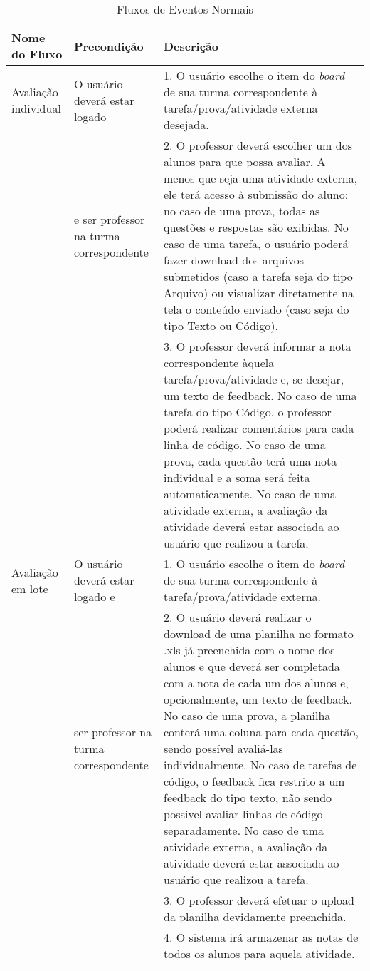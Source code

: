 \begin{table}[H]
	\centering \vspace{0.5cm} \footnotesize
	\caption{Fluxos de Eventos Normais}
	\begin{tabular}{|p{2.3cm}|p{2.5cm}|p{10cm}|} \hline  \rowcolor[rgb]{0.8,0.8,0.8}
		
		Nome do Fluxo & Precondição & Descrição  \\ \hline		
		
		Avaliação individual & O usuário deverá estar logado& 1. O usuário escolhe o item do \textit{board} de sua turma correspondente à tarefa/prova/atividade externa desejada.  \\
		{}    &  e ser professor na turma correspondente & 2. O professor deverá escolher um dos alunos para que possa avaliar. A menos que seja uma atividade externa, ele terá acesso à submissão do aluno: no caso de uma prova, todas as questões e respostas são exibidas. No caso de uma tarefa, o usuário poderá fazer download dos arquivos submetidos (caso a tarefa seja do tipo Arquivo) ou visualizar diretamente na tela o conteúdo enviado (caso seja do tipo Texto ou Código). \\
		{}    &  & 3. O professor deverá informar a nota correspondente àquela tarefa/prova/atividade e, se desejar, um texto de feedback. No caso de uma tarefa do tipo Código, o professor poderá realizar comentários para cada linha de código. No caso de uma prova, cada questão terá uma nota individual e a soma será feita automaticamente. No caso de uma atividade externa, a avaliação da atividade deverá estar associada ao usuário que realizou a tarefa.\\ \hline
		
		Avaliação em lote& O usuário deverá estar logado e & 1. O usuário escolhe o item do \textit{board} de sua turma correspondente à tarefa/prova/atividade externa.  \\
		{}     &  ser professor na turma correspondente & 2. O usuário deverá realizar o download de uma planilha no formato .xls já preenchida com o nome dos alunos e que deverá ser completada com a nota de cada um dos alunos e, opcionalmente, um texto de feedback. No caso de uma prova, a planilha conterá uma coluna para cada questão, sendo possível avaliá-las individualmente. No caso de tarefas de código, o feedback fica restrito a um feedback do tipo texto, não sendo possivel avaliar linhas de código separadamente. No caso de uma atividade externa, a avaliação da atividade deverá estar associada ao usuário que realizou a tarefa.\\
		{}    &  {} & 3. O professor deverá efetuar o upload da planilha devidamente preenchida. \\ 
		{}    & {} & 4. O sistema irá armazenar as notas de todos os alunos para aquela atividade. \\ \hline
		
	\end{tabular}
\end{table}

